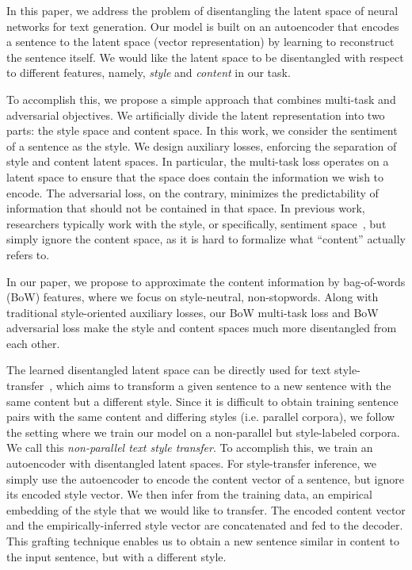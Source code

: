\documentclass[letterpaper]{article} %
\begin{document}
In this paper, we address the problem of disentangling the latent space of neural networks for text generation.
Our model is built on an autoencoder that encodes a sentence to the latent space (vector representation) by learning to reconstruct the sentence itself.
We would like the latent space to be disentangled with respect to different features, namely, \textit{style} and \textit{content} in our task.

To accomplish this, we propose a simple approach that combines multi-task and adversarial objectives.
We artificially divide the latent representation into two parts: the style space and content space. In this work, we consider the sentiment of a sentence as the style.
We design auxiliary losses, enforcing the separation of style and content latent spaces.
In particular, the multi-task loss operates on a latent space to ensure that the space does contain the information we wish to encode.
The adversarial loss, on the contrary, minimizes the predictability of information that should not be contained in that space.
In previous work, researchers typically work with the style, or specifically, sentiment space~\cite{hu2017toward,shen2017style,fu2018style}, but simply ignore the content space, as it is hard to formalize what ``content'' actually refers to.

In our paper, we propose to approximate the content information by bag-of-words (BoW) features, where we focus on style-neutral, non-stopwords.
Along with traditional style-oriented auxiliary losses, our BoW multi-task loss and BoW adversarial loss make the style and content spaces much more disentangled from each other.

The learned disentangled latent space can be directly used for text style-transfer~\cite{hu2017toward,shen2017style}, which aims to transform a given sentence to a new sentence with the same content but a different style.
Since it is difficult to obtain training sentence pairs with the same content and differing styles (i.e. parallel corpora), we follow the setting where we train our model on a non-parallel but style-labeled corpora. We call this \textit{non-parallel text style transfer}.
To accomplish this, we train an autoencoder with disentangled latent spaces.
For style-transfer inference, we simply use the autoencoder to encode the content vector of a sentence, but ignore its encoded style vector.
We then infer from the training data, an empirical embedding of the style that we would like to transfer.
The encoded content vector and the empirically-inferred style vector are concatenated and fed to the decoder.
This grafting technique enables us to obtain a new sentence similar in content to the input sentence, but with a different style.
\end{document}
